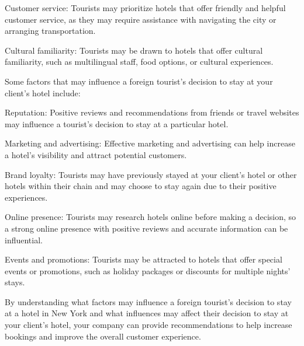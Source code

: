 \documentclass[12pt, a4paper, oneside]{article}
\begin{document}
Customer service: Tourists may prioritize hotels that offer friendly and helpful customer service, as they may require assistance with navigating the city or arranging transportation.

Cultural familiarity: Tourists may be drawn to hotels that offer cultural familiarity, such as multilingual staff, food options, or cultural experiences.

Some factors that may influence a foreign tourist's decision to stay at your client's hotel include:

Reputation: Positive reviews and recommendations from friends or travel websites may influence a tourist's decision to stay at a particular hotel.

Marketing and advertising: Effective marketing and advertising can help increase a hotel's visibility and attract potential customers.

Brand loyalty: Tourists may have previously stayed at your client's hotel or other hotels within their chain and may choose to stay again due to their positive experiences.

Online presence: Tourists may research hotels online before making a decision, so a strong online presence with positive reviews and accurate information can be influential.

Events and promotions: Tourists may be attracted to hotels that offer special events or promotions, such as holiday packages or discounts for multiple nights' stays.

By understanding what factors may influence a foreign tourist's decision to stay at a hotel in New York and what influences may affect their decision to stay at your client's hotel, your company can provide recommendations to help increase bookings and improve the overall customer experience.
\end{document}

